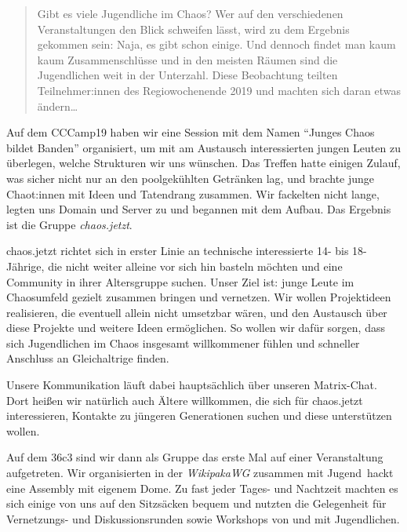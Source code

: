 \begin{DSarticle}[
    title={chaos.jetzt},
    author={dc7ia=lektorat@dc7ia.eu, ruru4143=ruru-cj-ds@r3.at, raketenlurch=raketenlurch@riseup.net}
    head=chaos.jetzt,
    tocentry=chaos.jetzt,
]

\begin{abstract}
Gibt es viele Jugendliche im Chaos?
Wer auf den verschiedenen Veranstaltungen den Blick schweifen lässt, wird zu dem Ergebnis gekommen sein:
Naja, es gibt schon einige.
Und dennoch findet man kaum kaum Zusammenschlüsse und in den meisten Räumen sind die Jugendlichen weit in der Unterzahl.
Diese Beobachtung teilten Teilnehmer:innen des Regiowochenende 2019 und machten sich daran etwas ändern\ldots
\end{abstract}


Auf dem CCCamp19 haben wir eine Session mit dem Namen \enquote{Junges Chaos bildet Banden} organisiert, um mit am Austausch interessierten
jungen Leuten zu überlegen, welche Strukturen wir uns wünschen.
Das Treffen hatte einigen Zulauf, was sicher nicht nur an den poolgekühlten Getränken lag, und brachte junge Chaot:innen mit Ideen und Tatendrang zusammen.
Wir fackelten nicht lange, legten uns Domain und Server zu und begannen mit dem Aufbau. Das Ergebnis ist die Gruppe \emph{chaos.jetzt}.

chaos.jetzt richtet sich in erster Linie an technische interessierte 14- bis 18-Jährige, die nicht weiter alleine vor sich hin basteln möchten und eine Community in ihrer Altersgruppe suchen.
Unser Ziel ist: junge Leute im Chaosumfeld gezielt zusammen bringen und vernetzen.
Wir wollen Projektideen realisieren, die eventuell allein nicht umsetzbar wären, und den Austausch über diese Projekte und weitere Ideen ermöglichen.
So wollen wir dafür sorgen, dass sich Jugendlichen im Chaos insgesamt willkommener fühlen und schneller Anschluss an Gleichaltrige finden.

Unsere Kommunikation läuft dabei hauptsächlich über unseren Matrix-Chat.
Dort heißen wir natürlich auch Ältere willkommen, die sich für chaos.jetzt interessieren, Kontakte zu jüngeren Generationen suchen und diese unterstützen wollen.

Auf dem 36c3 sind wir dann als Gruppe das erste Mal auf einer Veranstaltung aufgetreten. Wir organisierten in der \emph{WikipakaWG} zusammen mit Jugend~hackt eine Assembly mit eigenem Dome.
Zu fast jeder Tages- und Nachtzeit machten es sich einige von uns auf den Sitzsäcken bequem und nutzten die Gelegenheit für Vernetzungs- und Diskussionsrunden sowie Workshops von und mit Jugendlichen.


\end{DSarticle}
